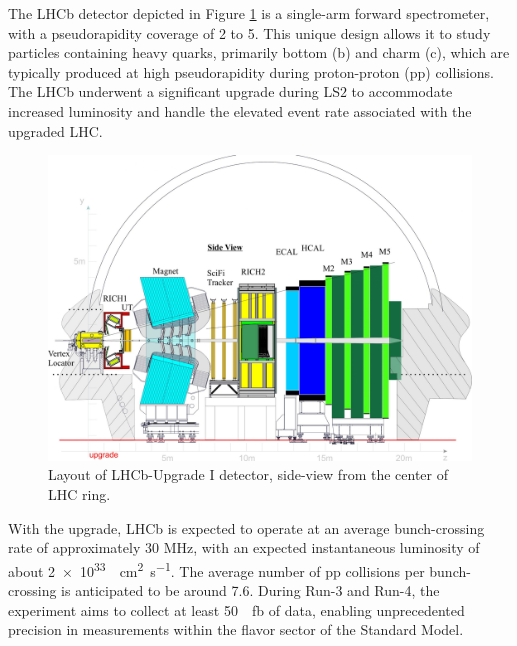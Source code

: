 The LHCb detector depicted in Figure \ref{fig:lhcb-detector} is a single-arm forward spectrometer, with a pseudorapidity coverage of 2 to 5. This unique design allows it to study particles containing heavy quarks, primarily bottom (b) and charm (c), which are typically produced at high pseudorapidity during proton-proton (pp) collisions. The LHCb underwent a significant upgrade during LS$2$ to accommodate increased luminosity and handle the elevated event rate associated with the upgraded LHC.
\begin{figure}[h]
    \centering
    \includegraphics[width=\textwidth]{figures/UT-upgrade-detector-scaled.jpeg}
    \caption{Layout of LHCb-Upgrade I detector, side-view from the center of LHC ring.}
    \label{fig:lhcb-detector}
\end{figure}
With the upgrade, LHCb is expected to operate at an average bunch-crossing rate of approximately 30 MHz, with an expected instantaneous luminosity of about \SI{2e33}{\per\centi\meter\squared\per\second}. The average number of pp collisions per bunch-crossing is anticipated to be around 7.6. During Run-3 and Run-4, the experiment aims to collect at least \SI{50}{\per\femto\barn} of data, enabling unprecedented precision in measurements within the flavor sector of the Standard Model.

